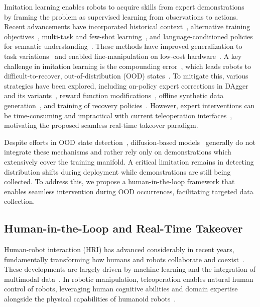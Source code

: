 Imitation learning enables robots to acquire skills from expert demonstrations~\cite{pomerleau1998alvinn} by framing the problem as supervised learning from observations to actions. Recent advancements have incorporated historical context~\cite{mandlekar2021matters, shafiullah2022behaviour, brohan2023rt1, jang2022bcz}, alternative training objectives~\cite{florence2022implicit, pari2021surprising}, multi-task and few-shot learning~\cite{duan2017oneshot, james2018task, dasari2021transformers}, and language-conditioned policies for semantic understanding~\cite{shridhar2023perceiver}. These methods have improved generalization to task variations~\cite{brohan2023rt1, kim2024goal, jang2022bcz} and enabled fine-manipulation on low-cost hardware~\cite{zhao2023learning}. A key challenge in imitation learning is the compounding error~\cite{ross2010efficient}, which leads robots to difficult-to-recover, out-of-distribution (OOD) states~\cite{ross2011reduction, tu2022sample}. To mitigate this, various strategies have been explored, including on-policy expert corrections in DAgger~\cite{ross2011reduction} and its variants~\cite{kelly2019hgdagger, menda2019ensembledagger}, reward function modifications~\cite{kumar2020conservative, yu2021combo}, offline synthetic data generation~\cite{florence2020self, ke2021grasping, zhou2023nerf}, and training of recovery policies~\cite{reichlin2022manifold}. However, expert interventions can be time-consuming and impractical with current teleoperation interfaces~\cite{ke2021grasping}, motivating the proposed seamless real-time takeover paradigm.

Despite efforts in OOD state detection~\cite{yang2024generalized, sinha2022system}, diffusion-based models~\cite{chi2023diffusion} generally do not integrate these mechanisms and rather rely only on demonstrations which extensively cover the training manifold. A critical limitation remains in detecting distribution shifts during deployment while demonstrations are still being collected. To address this, we propose a human-in-the-loop framework that enables seamless intervention during OOD occurrences, facilitating targeted data collection.



\subsection{Human-in-the-Loop and Real-Time Takeover}


Human-robot interaction (HRI) has advanced considerably in recent years, fundamentally transforming how humans and robots collaborate and coexist~\cite{obaigbena2024ai}. These developments are largely driven by machine learning and the integration of multimodal data~\cite{wang2024multimodal}. In robotic manipulation, teleoperation enables natural human control of robots, leveraging human cognitive abilities and domain expertise alongside the physical capabilities of humanoid robots~\cite{darvish2023teleoperation}.

